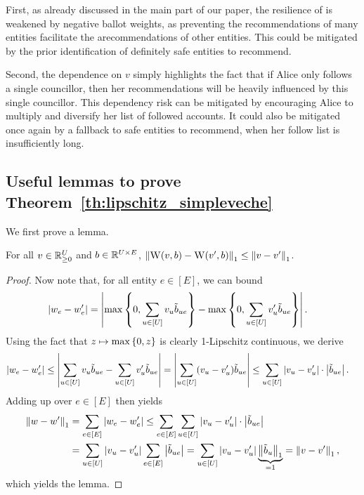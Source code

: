 First, as already discussed in the main part of our paper,
the resilience of \SimpleVeche{} is weakened by negative ballot weights,
as preventing the recommendations of many entities
facilitate the arecommendations of other entities.
This could be mitigated 
by the prior identification of definitely safe entities to recommend.

Second, the dependence on $v$ simply highlights the fact 
that if Alice only follows a single councillor,
then her recommendations will be heavily influenced by this single councillor.
This dependency risk can be mitigated by encouraging Alice 
to multiply and diversify her list of followed accounts.
It could also be mitigated once again by a fallback to safe entities to recommend,
when her follow list is insufficiently long.


\subsection{Useful lemmas to prove Theorem~\ref{th:lipschitz_simpleveche}}

We first prove a lemma.

\begin{lemma}
    \label{lemma:weights_resilience}
    For all $v \in \mathbb R_{\geq 0}^U$ and $b \in \mathbb R^{U \times E}$,
    $\left\lVert{\textsc{W}(v, b) - \textsc{W}(v', b)}\right\rVert_{1} \leq \left\lVert{v - v'}\right\rVert_{1}$.
\end{lemma}

\begin{proof}
    Now note that, for all entity $e \in [E]$, we can bound
    \begin{align}
        \left\lvert{w_e - w_e'}\right\rvert
        &= \left\lvert{
            \max\left\lbrace 0, \sum_{u \in [U]} v_u \tilde b_{ue} \right\rbrace
            - \max\left\lbrace 0, \sum_{u \in [U]} v_u' \tilde b_{ue} \right\rbrace
        }\right\rvert.
    \end{align}
    Using the fact that $z \mapsto \max \left\lbrace 0, z \right\rbrace$ 
    is clearly 1-Lipschitz continuous,
    we derive
    \begin{align}
        \left\lvert{w_e - w_e'}\right\rvert
        &\leq \left\lvert{
            \sum_{u \in [U]} v_u \tilde b_{ue}
            - \sum_{u \in [U]} v_u' \tilde b_{ue}
        }\right\rvert
        = \left\lvert{\sum_{u \in [U]} (v_u - v_u') \tilde b_{ue}}\right\rvert
        \leq \sum_{u \in [U]} \left\lvert{v_u - v_u'}\right\rvert \cdot \left\lvert{\tilde b_{ue}}\right\rvert.
    \end{align}
    Adding up over $e \in [E]$ then yields
    \begin{align}
        \left\lVert{w - w'}\right\rVert_{1}
        &= \sum_{e \in [E]} \left\lvert{w_e - w_e'}\right\rvert
        \leq \sum_{e \in [E]} \sum_{u \in [U]} \left\lvert{v_u - v_u'}\right\rvert \cdot \left\lvert{\tilde b_{ue}}\right\rvert \\
        &= \sum_{u \in [U]} \left\lvert{v_u - v_u'}\right\rvert \sum_{e \in [E]} \left\lvert{\tilde b_{ue}}\right\rvert
        = \sum_{u \in [U]}\left\lvert{v_u - v_u'}\right\rvert \underbrace{\left\lVert{\tilde b_u}\right\rVert_{1}}_{=1}
        = \left\lVert{v - v'}\right\rVert_{1},
    \end{align}
    which yields the lemma.
\end{proof}

